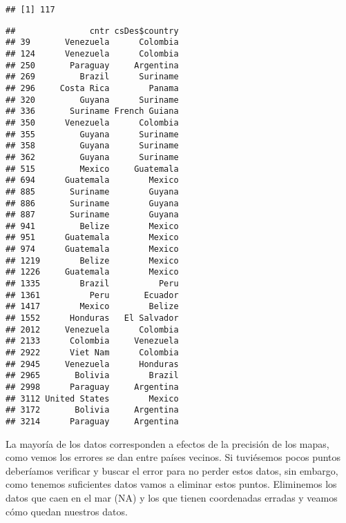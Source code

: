 \documentclass[]{article}
\newenvironment{Shaded}{\begin{snugshade}}{\end{snugshade}}
\newcommand{\KeywordTok}[1]{\textcolor[rgb]{0.13,0.29,0.53}{\textbf{{#1}}}}
\newcommand{\StringTok}[1]{\textcolor[rgb]{0.31,0.60,0.02}{{#1}}}
\newcommand{\CommentTok}[1]{\textcolor[rgb]{0.56,0.35,0.01}{\textit{{#1}}}}
\newcommand{\NormalTok}[1]{{#1}}
\begin{document}
\begin{verbatim}
## [1] 117
\end{verbatim}

\begin{Shaded}
\end{Shaded}

\begin{verbatim}
##               cntr csDes$country
## 39       Venezuela      Colombia
## 124      Venezuela      Colombia
## 250       Paraguay     Argentina
## 269         Brazil      Suriname
## 296     Costa Rica        Panama
## 320         Guyana      Suriname
## 336       Suriname French Guiana
## 350      Venezuela      Colombia
## 355         Guyana      Suriname
## 358         Guyana      Suriname
## 362         Guyana      Suriname
## 515         Mexico     Guatemala
## 694      Guatemala        Mexico
## 885       Suriname        Guyana
## 886       Suriname        Guyana
## 887       Suriname        Guyana
## 941         Belize        Mexico
## 951      Guatemala        Mexico
## 974      Guatemala        Mexico
## 1219        Belize        Mexico
## 1226     Guatemala        Mexico
## 1335        Brazil          Peru
## 1361          Peru       Ecuador
## 1417        Mexico        Belize
## 1552      Honduras   El Salvador
## 2012     Venezuela      Colombia
## 2133      Colombia     Venezuela
## 2922      Viet Nam      Colombia
## 2945     Venezuela      Honduras
## 2965       Bolivia        Brazil
## 2998      Paraguay     Argentina
## 3112 United States        Mexico
## 3172       Bolivia     Argentina
## 3214      Paraguay     Argentina
\end{verbatim}

La mayoría de los datos corresponden a efectos de la precisión de los
mapas, como vemos los errores se dan entre países vecinos. Si tuviésemos
pocos puntos deberíamos verificar y buscar el error para no perder estos
datos, sin embargo, como tenemos suficientes datos vamos a eliminar
estos puntos. Eliminemos los datos que caen en el mar (NA) y los que
tienen coordenadas erradas y veamos cómo quedan nuestros datos.
\end{document}
